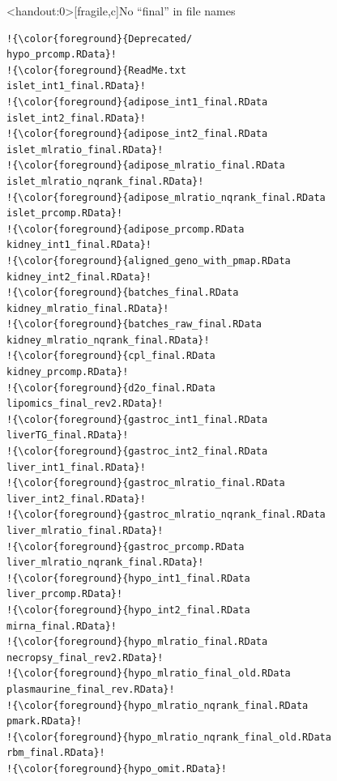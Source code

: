 \documentclass[aspectratio=169,12pt,t]{beamer}
\begin{document}
\begin{frame}<handout:0>[fragile,c]{No ``{\hilit final}'' in file names}


\addtocounter{framenumber}{-1}

\begin{center}
\begin{minipage}[c]{9.5cm}
\begin{semiverbatim}
\lstset{basicstyle=\tiny}
\begin{lstlisting}[escapechar=!,linewidth=9.5cm]
!{\color{foreground}{Deprecated/                            hypo_prcomp.RData}!
!{\color{foreground}{ReadMe.txt                             islet_int1_final.RData}!
!{\color{foreground}{adipose_int1_final.RData               islet_int2_final.RData}!
!{\color{foreground}{adipose_int2_final.RData               islet_mlratio_final.RData}!
!{\color{foreground}{adipose_mlratio_final.RData            islet_mlratio_nqrank_final.RData}!
!{\color{foreground}{adipose_mlratio_nqrank_final.RData     islet_prcomp.RData}!
!{\color{foreground}{adipose_prcomp.RData                   kidney_int1_final.RData}!
!{\color{foreground}{aligned_geno_with_pmap.RData           kidney_int2_final.RData}!
!{\color{foreground}{batches_final.RData                    kidney_mlratio_final.RData}!
!{\color{foreground}{batches_raw_final.RData                kidney_mlratio_nqrank_final.RData}!
!{\color{foreground}{cpl_final.RData                        kidney_prcomp.RData}!
!{\color{foreground}{d2o_final.RData                        lipomics_final_rev2.RData}!
!{\color{foreground}{gastroc_int1_final.RData               liverTG_final.RData}!
!{\color{foreground}{gastroc_int2_final.RData               liver_int1_final.RData}!
!{\color{foreground}{gastroc_mlratio_final.RData            liver_int2_final.RData}!
!{\color{foreground}{gastroc_mlratio_nqrank_final.RData     liver_mlratio_final.RData}!
!{\color{foreground}{gastroc_prcomp.RData                   liver_mlratio_nqrank_final.RData}!
!{\color{foreground}{hypo_int1_final.RData                  liver_prcomp.RData}!
!{\color{foreground}{hypo_int2_final.RData                  mirna_final.RData}!
!{\color{foreground}{hypo_mlratio_final.RData               necropsy_final_rev2.RData}!
!{\color{foreground}{hypo_mlratio_final_old.RData           plasmaurine_final_rev.RData}!
!{\color{foreground}{hypo_mlratio_nqrank_final.RData        pmark.RData}!
!{\color{foreground}{hypo_mlratio_nqrank_final_old.RData    rbm_final.RData}!
!{\color{foreground}{hypo_omit.RData}!
\end{lstlisting}
\end{semiverbatim}
\end{minipage}
\end{center}


\end{frame}
\end{document}
